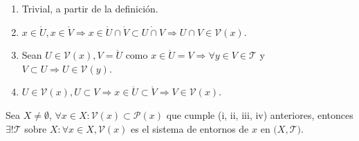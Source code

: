\begin{dem}
  \begin{enumerate}[label=(\roman*)]
    \item Trivial, a partir de la definición.
    \item $x \in \mathring{U}, x \in \mathring{V} \Rightarrow x \in \mathring{U} \cap \mathring{V} \subset \mathring{U \cap V} \Rightarrow U \cap V \in \mathcal{V}(x)$.
    \item Sean $ U \in \mathcal{V}(x), V = \mathring{U}$ como $x \in \mathring{U} = V \Rightarrow \forall y \in V \in \mathcal{T}$ y $V \subset U \Rightarrow U \in \mathcal{V}(y)$.
    \item $U \in \mathcal{V}(x), U \subset V \Rightarrow x \in \mathring{U} \subset \mathring{V} \Rightarrow V \in \mathcal{V}(x)$.
  \end{enumerate}
\end{dem}

\begin{prop}
  Sea $X \neq \emptyset$, $ \forall x \in X: \mathcal{V}(x)  \subset \mathcal{P}(x)$ que cumple (i, ii, iii, iv) anteriores, entonces $\exists! \mathcal{T}$ sobre $ X: \forall x \in X, \mathcal{V}(x)$ es el sistema de entornos de $x$ en $\big( X, \mathcal{T} \big)$.
\end{prop}
